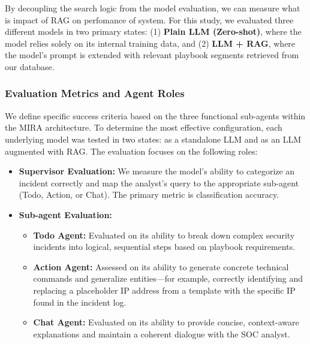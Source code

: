 \documentclass[conference]{IEEEtran}
\begin{document}
By decoupling the search logic from the model evaluation, we can measure what is impact of RAG on perfomance of system. 
For this study, we evaluated three different models in two primary states: (1) \textbf{Plain LLM (Zero-shot)}, 
where the model relies solely on its internal training data, and (2) \textbf{LLM + RAG}, 
where the model's prompt is extended with relevant playbook segments retrieved from our database.

\subsubsection{Evaluation Metrics and Agent Roles}
We define specific success criteria based on the three functional sub-agents within the MIRA architecture. To determine the most effective configuration, 
each underlying model was tested in two states: as a standalone LLM and as an LLM augmented with RAG. The evaluation focuses on the following roles:
\begin{itemize}
    \item \textbf{Supervisor Evaluation:} We measure the model's ability to categorize an incident correctly and map the analyst's query to the appropriate sub-agent (Todo, Action, or Chat). The primary metric is classification accuracy.
    \item \textbf{Sub-agent Evaluation:}
    \begin{itemize}
        \item \textbf{Todo Agent:} Evaluated on its ability to break down complex security incidents into logical, sequential steps based on playbook requirements.
        \item \textbf{Action Agent:} Assessed on its ability to generate concrete technical commands and generalize entities—for example, correctly identifying and replacing a placeholder IP address from a template with the specific IP found in the incident log.
        \item \textbf{Chat Agent:} Evaluated on its ability to provide concise, context-aware explanations and maintain a coherent dialogue with the SOC analyst.
    \end{itemize}
\end{itemize}
\end{document}
